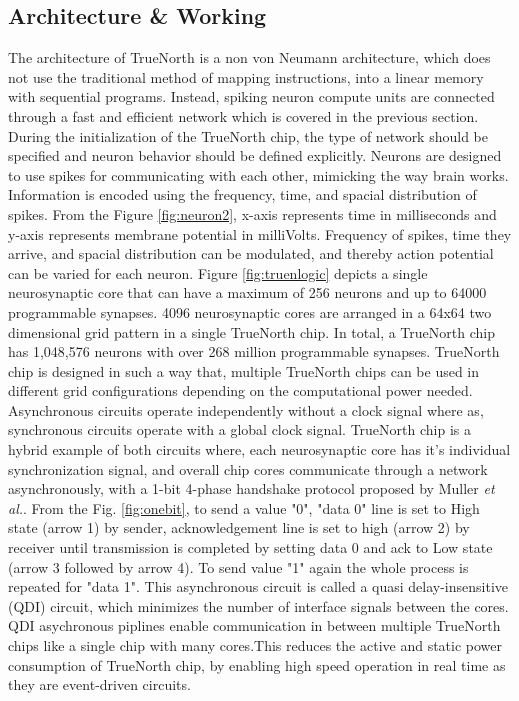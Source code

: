 \documentclass[11pt,twoside]{article}
\begin{document}
\subsection{Architecture \& Working}
The architecture of TrueNorth is a non von Neumann architecture, which does not use the traditional method of mapping instructions, into a linear memory with sequential programs. Instead, spiking neuron compute units are connected through a fast and efficient network which is covered in the previous section. During the initialization of the TrueNorth chip, the type of network should be specified and neuron behavior should be defined explicitly. Neurons are designed to use spikes for communicating with each other, mimicking the way brain works. Information is encoded using the frequency, time, and spacial distribution of spikes. From the Figure \ref{fig:neuron2}, x-axis represents time in milliseconds and y-axis represents membrane potential in milliVolts. Frequency of spikes, time they arrive, and spacial distribution can be modulated, and thereby action potential can be varied for each neuron. Figure \ref{fig:truenlogic} depicts a single neurosynaptic core that can have a maximum of 256 neurons and up to 64000 programmable synapses. 4096 neurosynaptic cores are arranged in a 64x64 two dimensional grid pattern in a single TrueNorth chip. In total, a TrueNorth chip has 1,048,576 neurons with over 268 million programmable synapses. TrueNorth chip is designed in such a way that, multiple TrueNorth chips can be used in different grid configurations depending on the computational power needed. Asynchronous circuits operate independently without a clock signal where as, synchronous circuits operate with a global clock signal. TrueNorth chip is a hybrid example of both circuits where, each neurosynaptic core has it's individual synchronization signal, and overall chip cores communicate through a network asynchronously, with a 1-bit 4-phase handshake protocol proposed by Muller \textit{et al.}\cite{muller1956theory}. From the Fig. \ref{fig:onebit}, to send a value "0", "data 0" line is set to High state (arrow 1) by sender, acknowledgement line is set to high (arrow 2) by receiver until transmission is completed by setting data 0 and ack to Low state (arrow 3 followed by arrow 4). To send value "1" again the whole process is repeated for "data 1". This asynchronous circuit is called a quasi delay-insensitive (QDI) circuit, which minimizes the number of interface signals between the cores. QDI asychronous piplines enable communication in between multiple TrueNorth chips like a single chip with many cores.This reduces the active and static power consumption of TrueNorth chip, by enabling high speed operation in real time as they are event-driven circuits.
\end{document}
